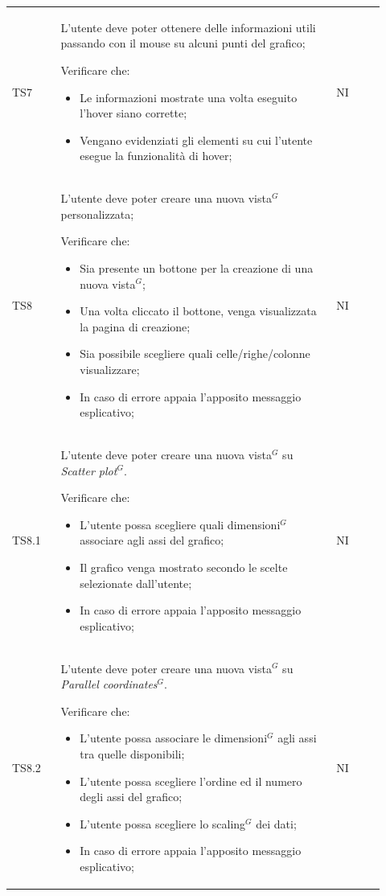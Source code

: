 \begin{longtable}{p{0.12\linewidth}p{0.68\linewidth}p{0.12\linewidth}}
    \rowcolor[RGB]{233, 245, 206}
    TS7 &
    L'utente deve poter ottenere delle informazioni utili passando con il mouse su alcuni punti del grafico;\par
    Verificare che:
    \begin{itemize}
        \item Le informazioni mostrate una volta eseguito l'hover siano corrette;
        \item Vengano evidenziati gli elementi su cui l'utente esegue la funzionalità di hover;
    \end{itemize}&
    NI \\

    \rowcolor[RGB]{216, 235, 171}
    TS8 &
    L'utente deve poter creare una nuova vista$^{G}$ personalizzata; \par
    Verificare che:
    \begin{itemize}
        \item Sia presente un bottone per la creazione di una nuova vista$^{G}$;
        \item Una volta cliccato il bottone, venga visualizzata la pagina di creazione;
        \item Sia possibile scegliere quali celle/righe/colonne visualizzare;
        \item In caso di errore appaia l’apposito messaggio esplicativo;
    \end{itemize}&
    NI \\

    \rowcolor[RGB]{233, 245, 206}
    TS8.1 &
    L'utente deve poter creare una nuova vista$^{G}$ su \textit{Scatter plot}$^{G}$. \par
    Verificare che:
    \begin{itemize}
        \item L'utente possa scegliere quali dimensioni$^{G}$ associare agli assi del grafico;
        \item Il grafico venga mostrato secondo le scelte selezionate dall'utente;
        \item In caso di errore appaia l’apposito messaggio esplicativo;
    \end{itemize}&
    NI \\

    \rowcolor[RGB]{216, 235, 171}
    TS8.2 & 
    L'utente deve poter creare una nuova vista$^{G}$ su \textit{Parallel coordinates}$^{G}$. \par
    Verificare che:
    \begin{itemize}
        \item L'utente possa associare le dimensioni$^{G}$ agli assi tra quelle disponibili;
        \item L'utente possa scegliere l'ordine ed il numero degli assi del grafico;
        \item L'utente possa scegliere lo scaling$^{G}$ dei dati;
        \item In caso di errore appaia l’apposito messaggio esplicativo;
    \end{itemize}&
    NI \\


\end{longtable}
